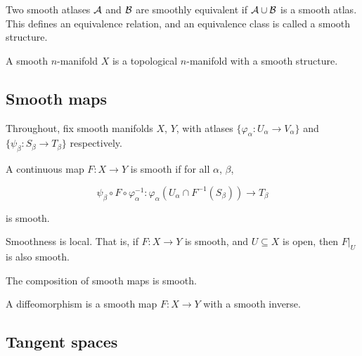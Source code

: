 \begin{definition}

    Two smooth atlases \(\mathcal{A}\) and \(\mathcal{B}\) are smoothly equivalent if \(\mathcal{A} \cup \mathcal{B}\) is a smooth atlas. This defines an equivalence relation, and an equivalence class is called a smooth structure.
\end{definition}

\begin{definition}

    A smooth \(n\)-manifold \(X\) is a topological \(n\)-manifold with a smooth structure.
\end{definition}

\subsection{Smooth maps}

Throughout, fix smooth manifolds \(X\), \(Y\), with atlases \(\{\varphi_\alpha : U_\alpha \to V_\alpha\}\) and \(\{\psi_\beta : S_\beta \to T_\beta\}\) respectively.

\begin{definition}
     A continuous map \(F : X \to Y\) is smooth if for all \(\alpha\), \(\beta\), 

    \[\psi_\beta \circ F \circ \varphi_\alpha^{-1} : \varphi_\alpha(U_\alpha \cap F^{-1}(S_\beta)) \to T_\beta\]

    is smooth.
\end{definition}

\begin{lemma}
    Smoothness is local. That is, if \(F : X \to Y\) is smooth, and \(U \subseteq X\) is open, then \(F\vert_U\) is also smooth.
\end{lemma}

\begin{lemma}
    The composition of smooth maps is smooth.
\end{lemma}

\begin{definition}
    [diffeomorphism]

    A diffeomorphism is a smooth map \(F : X \to Y\) with a smooth inverse.
\end{definition}

\subsection{Tangent spaces}

